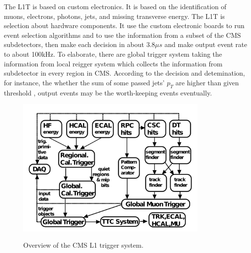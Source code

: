 		
		The L1T is based on custom electronics. It is based on the identification of muons, electrons, photons, jets, and missing transverse energy. The L1T is selection about hardware components. It use the custom electronic boards to run event selection algorithms and to use the information from a subset of the CMS subdetectors, then make each decision in about $3.8\mu s$ and make output event rate to about 100kHz. To elaborate, there are global trigger system taking the information from local reigger system which collects the information from subdetector in every region in CMS. According to the decision and detemination, for instance, the whether the sum of some passed jets' $p_T$ are higher than given threshold , output events may be the worth-keeping events eventually. 

		\begin{figure}[H]
		\centering{}
			\includegraphics[width=0.85\textwidth]{Figures/PhysObj/L1T.png}\\
		\caption{Overview of the CMS L1 trigger system. \cite{Khachatryan:2016bia}}
		\label{PhysObj:fig:L1T}
		\end{figure}
		\FloatBarrier

